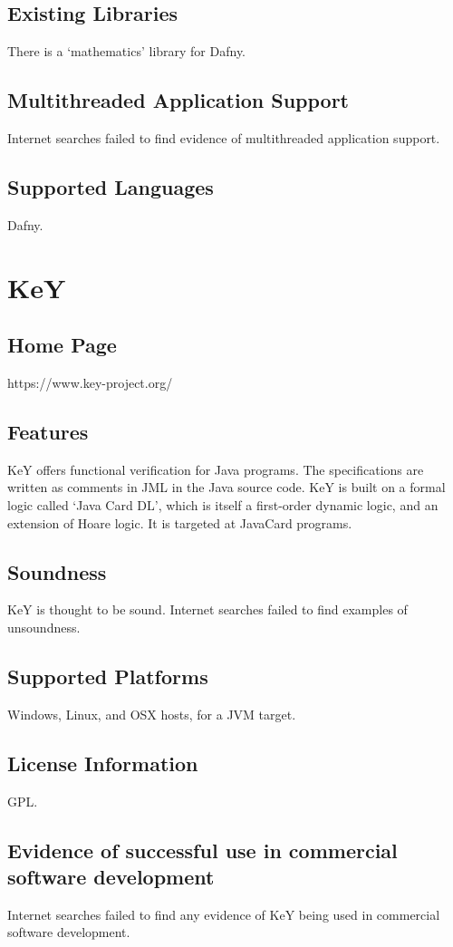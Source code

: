 \documentclass[12pt,openany,a4paper]{book}
\begin{document}
	\subsection{Existing Libraries}
		There is a `mathematics' library for Dafny.
		
	\subsection{Multithreaded Application Support}
		Internet searches failed to find evidence of multithreaded application support. 
		
	\subsection{Supported Languages}
		Dafny.

\section{KeY}
	\subsection{Home Page}%
	https://www.key-project.org/
	\subsection{Features} 
		KeY offers functional verification for Java programs. The specifications are written as comments in JML in the Java source code. KeY is built on a formal logic called `Java Card DL', which is itself a first-order dynamic logic, and an extension of Hoare logic. It is targeted at JavaCard programs. 
	\subsection{Soundness} 
		KeY is thought to be sound. Internet searches failed to find examples of unsoundness.
	\subsection{Supported Platforms} 
		Windows, Linux, and OSX hosts, for a JVM target.
	\subsection{License Information} 
		GPL.		
	\subsection{Evidence of successful use in commercial software development} 
		Internet searches failed to find any evidence of KeY being used in commercial software development. 
\end{document}
